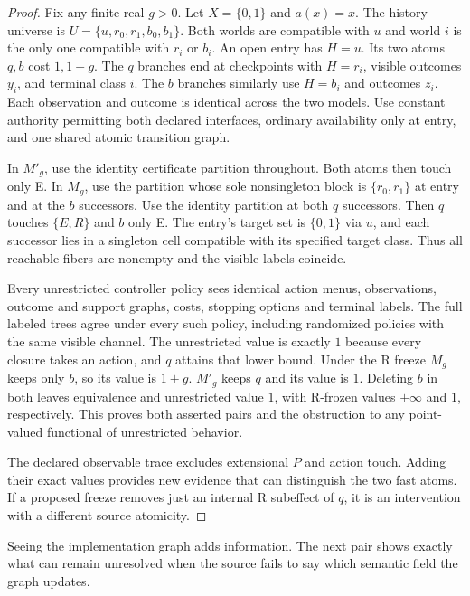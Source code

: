 \begin{proof}

Fix any finite real \(g>0\). Let \(X=\{0,1\}\) and \(a(x)=x\). The history universe is \(U=\{u,r_0,r_1,b_0,b_1\}\). Both worlds are compatible with \(u\) and world \(i\) is the only one compatible with \(r_i\) or \(b_i\). An open entry has \(H=u\). Its two atoms \(q,b\) cost \(1,1+g\). The \(q\) branches end at checkpoints with \(H=r_i\), visible outcomes \(y_i\), and terminal class \(i\). The \(b\) branches similarly use \(H=b_i\) and outcomes \(z_i\). Each observation and outcome is identical across the two models. Use constant authority permitting both declared interfaces, ordinary availability only at entry, and one shared atomic transition graph.

In \(M'_g\), use the identity certificate partition throughout. Both atoms then touch only E. In \(M_g\), use the partition whose sole nonsingleton block is \(\{r_0,r_1\}\) at entry and at the \(b\) successors. Use the identity partition at both \(q\) successors. Then \(q\) touches \(\{E,R\}\) and \(b\) only E. The entry's target set is \(\{0,1\}\) via \(u\), and each successor lies in a singleton cell compatible with its specified target class. Thus all reachable fibers are nonempty and the visible labels coincide.

Every unrestricted controller policy sees identical action menus, observations, outcome and support graphs, costs, stopping options and terminal labels. The full labeled trees agree under every such policy, including randomized policies with the same visible channel. The unrestricted value is exactly \(1\) because every closure takes an action, and \(q\) attains that lower bound. Under the R freeze \(M_g\) keeps only \(b\), so its value is \(1+g\). \(M'_g\) keeps \(q\) and its value is \(1\). Deleting \(b\) in both leaves equivalence and unrestricted value \(1\), with R-frozen values \(+\infty\) and \(1\), respectively. This proves both asserted pairs and the obstruction to any point-valued functional of unrestricted behavior.

The declared observable trace excludes extensional \(P\) and action touch. Adding their exact values provides new evidence that can distinguish the two fast atoms. If a proposed freeze removes just an internal R subeffect of \(q\), it is an intervention with a different source atomicity.

\end{proof}

Seeing the implementation graph adds information. The next pair shows exactly what can remain unresolved when the source fails to say which semantic field the graph updates.

